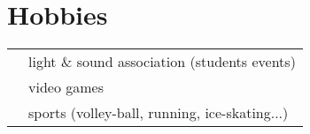 \documentclass[oneside]{article}
\begin{document}
{\begin{minipage}[t][\textheight-2\fboxsep-2\fboxrule][t]{\dimexpr0.35\textwidth-2\fboxrule-2\fboxsep\relax}
        \section*{\large Hobbies}
        \begin{tabularx}{\textwidth}{cY}
            \faHeadset{} & light \& sound association (students events) \\
            \faGamepad{} & video games \\
            \faWalking{} & sports (volley-ball, running, ice-skating...) \\
        \end{tabularx}
        \vspace{.1cm}
        \vfill
    \end{minipage}
}
\hfill
\end{document}
